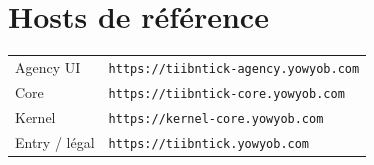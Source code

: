 \section{Hosts de référence}

\begin{tabular}{@{}ll@{}}
\toprule
Agency UI & \texttt{https://tiibntick-agency.yowyob.com} \\
Core & \texttt{https://tiibntick-core.yowyob.com} \\
Kernel & \texttt{https://kernel-core.yowyob.com} \\
Entry / légal & \texttt{https://tiibntick.yowyob.com} \\
\bottomrule
\end{tabular}
